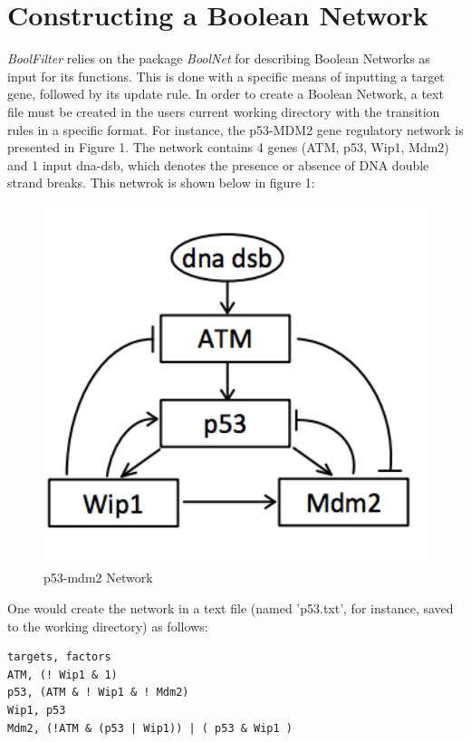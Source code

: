 \documentclass[a4paper]{article}
\theoremstyle{plain}
\theoremstyle{definition}
\theoremstyle{remark}
\begin{document}
\section{Constructing a Boolean Network}
\textit{BoolFilter} relies on the package \textit{BoolNet} for describing Boolean Networks as input for its functions. This is done with a specific means of inputting a target gene, followed by its update rule\cite{mussel2015boolnet}. In order to create a Boolean Network, a text file must be created in the users current working directory with the transition rules in a specific format. For instance, the p53-MDM2 gene regulatory network is presented in Figure 1. The network contains 4 genes (ATM, p53, Wip1, Mdm2) and 1 input dna-dsb, which denotes the presence or absence of DNA double strand breaks.  This netwrok is shown below in figure 1:
\pagebreak
\begin{figure}[h]
\hfill
\begin{center}
\begin{minipage}{0.35\textwidth}
\includegraphics[width=1\textwidth]{Figures/p53.png}
\caption{p53-mdm2 Network}
\label{p53-mdm2 Network}
\end{minipage}
\end{center}
\end{figure}

One would create the network in a text file (named 'p53.txt', for instance, saved to the working directory) as follows:
\begin{verbatim}
targets, factors
ATM, (! Wip1 & 1)
p53, (ATM & ! Wip1 & ! Mdm2)
Wip1, p53
Mdm2, (!ATM & (p53 | Wip1)) | ( p53 & Wip1 )
\end{verbatim}
\end{document}
